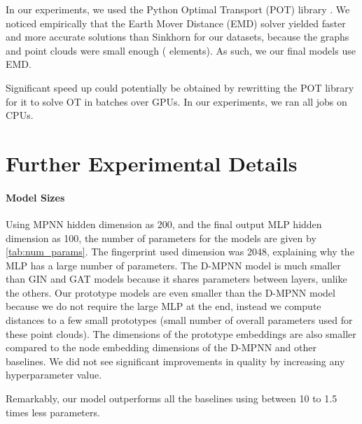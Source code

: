 \documentclass[letterpaper]{article} \usepackage{aaai22}  \usepackage{times}  \usepackage{helvet}  \usepackage{courier}  \usepackage[hyphens]{url}  \usepackage{graphicx} \urlstyle{rm} \def\UrlFont{\rm}  \usepackage{natbib}  \usepackage{caption} \DeclareCaptionStyle{ruled}{labelfont=normalfont,labelsep=colon,strut=off} \frenchspacing  \setlength{\pdfpagewidth}{8.5in}  \setlength{\pdfpageheight}{11in}  \usepackage{algorithm}
\begin{document}
In our experiments, we used the Python Optimal Transport (POT) library \citep{flamary2017pot}. We noticed empirically that the Earth Mover Distance (EMD) solver yielded faster and more accurate solutions than Sinkhorn for our datasets, because the graphs and point clouds were small enough ( elements). As such, we our final models use EMD.

Significant speed up could potentially be obtained by rewritting the POT library for it to solve OT in batches over GPUs. In our experiments, we ran all jobs on CPUs.

\section{Further Experimental Details}\label{sec:experimental-details}

\paragraph{Model Sizes}

Using MPNN hidden dimension as 200, and the final output MLP hidden dimension as 100, the number of parameters for the models are given by \cref{tab:num_params}. The fingerprint used dimension was 2048, explaining why the MLP has a large number of parameters. The D-MPNN model is much smaller than GIN and GAT models because it shares parameters between layers, unlike the others. Our prototype models are even smaller than the D-MPNN model because we do not require the large MLP at the end, instead we compute distances to a few small prototypes (small number of overall parameters used for these point clouds). The  dimensions of the prototype embeddings are also smaller compared to the node embedding dimensions of the D-MPNN and other baselines. We did not see significant improvements in quality by increasing any hyperparameter value.

Remarkably, our model outperforms all the baselines using between 10 to 1.5 times less parameters.
\end{document}
